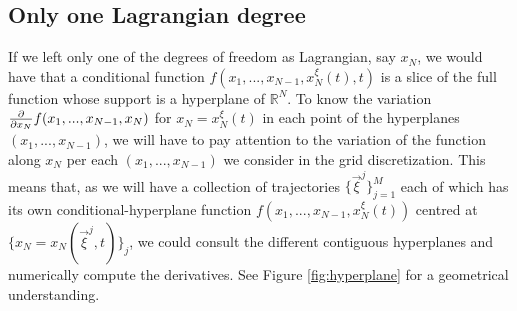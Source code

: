 \documentclass[11pt, a4paper]{article} %
\newcommand{\R}{\mathbb{R}} %
\begin{document}
\subsection*{Only one Lagrangian degree}
If we left only one of the degrees of freedom as Lagrangian, say $x_N$, we would have that a conditional function $f(x_1,...,x_{N-1},x_N^\xi(t),t)$ is a slice of the full function whose support is a hyperplane of $\R^N$. To know the variation $\pdv{}{x_N}f(x_1,...,x_{N-1},x_N)$ for $x_N=x_N^\xi(t)$ in each point of the hyperplanes $(x_1,...,x_{N-1})$, we will have to pay attention to the variation of the function along $x_N$ per each $(x_1,...,x_{N-1})$ we consider in the grid discretization. This means that, as we will have a collection of trajectories $\{\vec{\xi}^j\}_{j=1}^M$ each of which has its own conditional-hyperplane function $f(x_1,...,x_{N-1},x_N^\xi(t))$ centred at $\{x_N=x_N(\vec{\xi}^j,t)\}_j$, we could consult the different contiguous hyperplanes and numerically compute the derivatives. See Figure \ref{fig:hyperplane} for a geometrical understanding.
\end{document}
